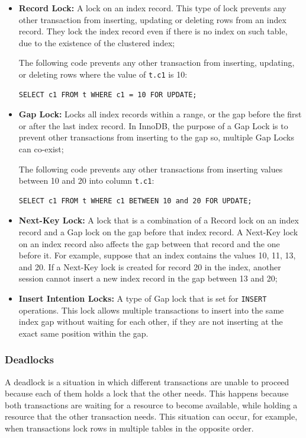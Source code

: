 \documentclass[12pt]{article}
\begin{document}
\begin{itemize}
    \item \textbf{Record Lock:} A lock on an index record. This type of lock prevents any other transaction from inserting, updating or deleting rows from an index record. They lock the index record even if there is no index on such table, due to the existence of the clustered index;
    
    \vspace{0.3cm}
    The following code prevents any other transaction from inserting, updating, or deleting rows where the value of \verb|t.c1| is 10:
\begin{verbatim}
SELECT c1 FROM t WHERE c1 = 10 FOR UPDATE;
\end{verbatim}
    
    
    \item \textbf{Gap Lock:} Locks all index records within a range, or the gap before the first or after the last index record. In InnoDB, the purpose of a Gap Lock is to prevent other transactions from inserting to the gap so, multiple Gap Locks can co-exist;
    
    \vspace{0.3cm}
    The following code prevents any other transactions from inserting values between 10 and 20 into column \verb|t.c1|: 
\begin{verbatim}
SELECT c1 FROM t WHERE c1 BETWEEN 10 and 20 FOR UPDATE;
\end{verbatim}

    \item \textbf{Next-Key Lock:} A lock that is a combination of a Record lock on an index record and a Gap lock on the gap before that index record. A Next-Key lock on an index record also affects the gap between that record and the one before it. For example, suppose that an index contains the values 10, 11, 13, and 20. If a Next-Key lock is created for record 20 in the index, another session cannot insert a new index record in the gap between 13 and 20;
    
    \item \textbf{Insert Intention Locks:} A type of Gap lock that is set for \verb|INSERT| operations. This lock allows multiple transactions to insert into the same index gap without waiting for each other, if they are not inserting at the exact same position within the gap.

\end{itemize}

\subsubsection{Deadlocks}
\label{deadLocks} 
A deadlock is a situation in which different transactions are unable to proceed because each of them holds a lock that the other needs. This happens because both transactions are waiting for a resource to become available, while holding a resource that the other transaction needs. This situation can occur, for example, when transactions lock rows in multiple tables in the opposite order\parencite{deadlocksInInnoDB}.
\end{document}
